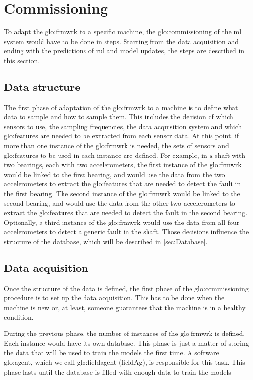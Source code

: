 \section{Commissioning}
\label{sec:commissioning}
To adapt the \gls{glo:frmwrk} to a specific machine, the \gls{glo:commissioning} of the \gls{ml} system would have to be done in steps. Starting from the data acquisition and ending with the predictions of \gls{rul} and model updates, the steps are described in this section.

\subsection{Data structure}
\label{sec:Data_structure}
The first phase of adaptation of the \gls{glo:frmwrk} to a machine is to define what data to sample and how to sample them. This includes the decision of which sensors to use, the sampling frequencies, the data acquisition system and which \gls{glo:feature}s are needed to be extracted from each sensor data. At this point, if more than one instance of the \gls{glo:frmwrk} is needed, the sets of sensors and \gls{glo:feature}s to be used in each instance are defined. For example, in a shaft with two bearings, each with two accelerometers, the first instance of the \gls{glo:frmwrk} would be linked to the first bearing, and would use the data from the two accelerometers to extract the \gls{glo:feature}s that are needed to detect the fault in the first bearing. The second instance of the \gls{glo:frmwrk} would be linked to the second bearing, and would use the data from the other two accelerometers to extract the \gls{glo:feature}s that are needed to detect the fault in the second bearing. Optionally, a third instance of the \gls{glo:frmwrk} would use the data from all four accelerometers to detect a generic fault in the shaft.
Those decisions influence the structure of the database, which will be described in \autoref{sec:Database}. 

\subsection{Data acquisition}
Once the structure of the data is defined, the first phase of the \gls{glo:commissioning} procedure is to set up the data acquisition. This has to be done when the machine is new or, at least, someone guarantees that the machine is in a healthy condition.

During the previous phase, the number of instances of the \gls{glo:frmwrk} is defined. Each instance would have its own database. This phase is just a matter of storing the data that will be used to train the models the first time. A software \gls{glo:agent}, which we call \gls{glo:fieldagent} (\gls{fieldAg}), is responsible for this task. 
This phase lasts until the database is filled with enough data to train the models.

